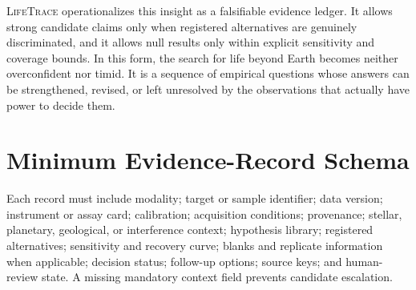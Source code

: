 \documentclass[conference]{IEEEtran}
\newcommand{\lifetrace}{\textsc{LifeTrace}}
\begin{document}
\lifetrace{} operationalizes this insight as a falsifiable evidence ledger. It allows strong candidate claims only when registered alternatives are genuinely discriminated, and it allows null results only within explicit sensitivity and coverage bounds. In this form, the search for life beyond Earth becomes neither overconfident nor timid. It is a sequence of empirical questions whose answers can be strengthened, revised, or left unresolved by the observations that actually have power to decide them.

\appendices
\section{Minimum Evidence-Record Schema}

Each record must include modality; target or sample identifier; data version; instrument or assay card; calibration; acquisition conditions; provenance; stellar, planetary, geological, or interference context; hypothesis library; registered alternatives; sensitivity and recovery curve; blanks and replicate information when applicable; decision status; follow-up options; source keys; and human-review state. A missing mandatory context field prevents candidate escalation.
\end{document}
